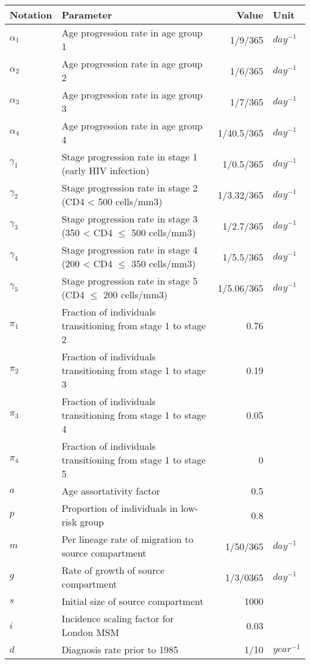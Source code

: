 \begin{tabular}{llrl}
    \hline 	%
	Notation		&	Parameter	&	Value	&	Unit	\\
	\hline 	%
$	\alpha_1	$	&	Age progression rate in age group 1	&	1/9/365	&	$day^{-1}$	\\
$	\alpha_2	$	&	Age progression rate in age group 2	&	1/6/365	&	$day^{-1}$	\\
$	\alpha_3	$	&	Age progression rate in age group 3	&	1/7/365	&	$day^{-1}$	\\
$	\alpha_4	$	&	Age progression rate in age group 4	&	1/40.5/365	&	$day^{-1}$	\\
$	\gamma_1	$	&	Stage progression rate in stage 1 (early HIV infection) 	&	1/0.5/365	&	$day^{-1}$	\\
$	\gamma_2	$	&	Stage progression rate in stage 2 (CD4 < 500 cells/mm3)	&	1/3.32/365	&	$day^{-1}$	\\
$	\gamma_3	$	&	Stage progression rate in stage 3 (350 < CD4 $\leq$ 500 cells/mm3)	&	1/2.7/365	&	$day^{-1}$	\\
$	\gamma_4	$	&	Stage progression rate in stage 4 (200 < CD4 $\le$ 350 cells/mm3)	&	1/5.5/365	&	$day^{-1}$	\\
$	\gamma_5	$	&	Stage progression rate in stage 5 (CD4 $\leq$ 200 cells/mm3)	&	1/5.06/365	&	$day^{-1}$	\\
$	\pi_1	$	&	Fraction of individuals transitioning from stage 1 to stage 2 	&	0.76	&		\\
$	\pi_2	$	&	Fraction of individuals transitioning from stage 1 to stage 3	&	0.19	&		\\
$	\pi_3	$	&	Fraction of individuals transitioning from stage 1 to stage 4	&	0.05	&		\\
$	\pi_4	$	&	Fraction of individuals transitioning from stage 1 to stage 5	&	0	&		\\
$	a	$	&	Age assortativity factor	&	0.5	&		\\
$	p	$	&	Proportion of individuals in low-risk group	&	0.8	&		\\
$	m	$	&	Per lineage rate of migration to source compartment	&	1/50/365	&	$day^{-1}$	\\
$	g	$	&	Rate of growth of source compartment	&	1/3/0365	&	$day^{-1}$	\\
$	s	$	&	Initial size of source compartment	&	1000	&		\\
$	i	$	&	Incidence scaling factor for London MSM	&	0.03	&		\\
$	d	$	&	Diagnosis rate prior to 1985	&	1/10	&	$year^{-1}$	\\

\end{tabular}
